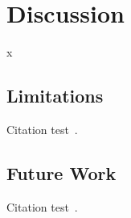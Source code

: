 
\chapter{Discussion}\label{chapter:discussion}
x

\section{Limitations}
Citation test~\parencite{latex}.

\section{Future Work}
Citation test~\parencite{latex}.
